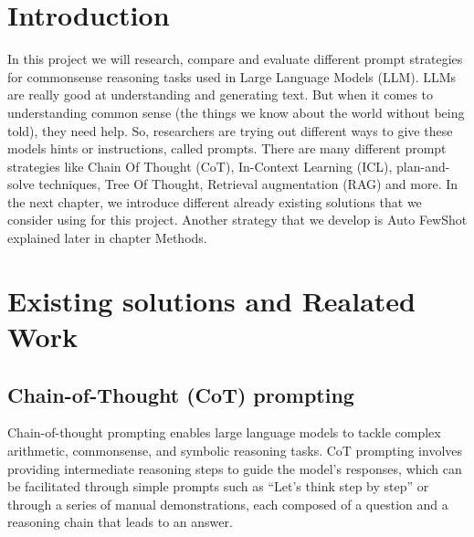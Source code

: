 \documentclass[fleqn,moreauthors,10pt]{ds_report}
\affiliation{\textit{Advisors: Aleš Žagar}}
\begin{document}
\flushbottom 

\maketitle 

\thispagestyle{empty} 


\section*{Introduction}

    In this project we will research, compare and evaluate different prompt strategies for commonsense reasoning tasks used in Large Language Models (LLM). LLMs are really good at understanding and generating text. But when it comes to understanding common sense (the things we know about the world without being told), they need help. So, researchers are trying out different ways to give these models hints or instructions, called prompts. There are many different prompt strategies like Chain Of Thought (CoT), In-Context Learning (ICL), plan-and-solve techniques, Tree Of Thought, Retrieval augmentation (RAG) and more. In the next chapter, we introduce different already existing solutions that we consider using for this project. Another strategy that we develop is Auto FewShot explained later in chapter Methods.\cite{Prompt} 
	


\section*{Existing solutions and Realated Work}

\subsection*{Chain-of-Thought (CoT) prompting}

Chain-of-thought prompting enables large language models to tackle complex arithmetic, commonsense, and symbolic reasoning tasks. CoT prompting involves providing intermediate reasoning steps to guide the model’s responses, which can be facilitated through simple prompts such as “Let’s think step by step” or through a series of manual demonstrations, each composed of a question and a reasoning chain that leads to an answer. \cite{Prompt} 
\end{document}
